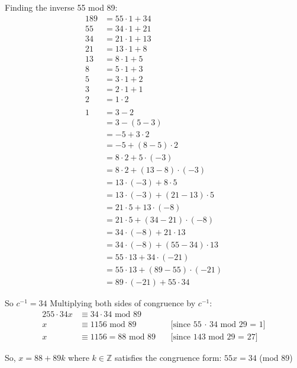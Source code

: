 \documentclass{article} %
\begin{document}
    Finding the inverse 55 mod 89:
    \begin{alignat*}{1}
        89 &= 55 \cdot 1 + 34\\
        55 &= 34 \cdot 1 + 21\\
        34 &= 21 \cdot 1 + 13\\
        21 &= 13 \cdot 1 + 8\\
        13 &= 8 \cdot 1 + 5\\
        8 &= 5 \cdot 1 + 3\\
        5 &= 3 \cdot 1 + 2\\
        3 &= 2 \cdot 1 + 1\\
        2 &= 1 \cdot 2\\
        \\
        1 &= 3 - 2\\
        &= 3 - (5 - 3)\\
        &= -5 + 3 \cdot 2\\
        &= -5 + (8 - 5) \cdot 2\\
        &= 8 \cdot 2 + 5 \cdot (-3)\\
        &= 8 \cdot 2 + (13 - 8) \cdot (-3)\\
        &= 13 \cdot (-3) + 8 \cdot 5\\
        &= 13 \cdot (-3) + (21 - 13) \cdot 5\\
        &= 21 \cdot 5 + 13 \cdot (-8)\\
        &= 21 \cdot 5 + (34 - 21) \cdot (-8)\\
        &= 34 \cdot (-8) + 21 \cdot 13\\
        &= 34 \cdot (-8) + (55 - 34) \cdot 13\\
        &= 55 \cdot 13 + 34 \cdot (-21)\\
        &= 55 \cdot 13 + (89 - 55) \cdot (-21)\\
        &= 89 \cdot (-21) + 55 \cdot 34
    \end{alignat*}

    So $c^{-1} = 34$
    Multiplying both sides of congruence by $c^{-1}$:
    \begin{alignat*}{2}
        55 \cdot 34x &\equiv 34 \cdot 34 \text{ mod } 89\ \\
        x &\equiv 1156 \text{ mod } 89 && \text{[since 55 $\cdot$ 34 mod 29 = 1]}\\
        x &\equiv 1156 = 88 \text{ mod } 89\ && \text{[since 143 mod 29 = 27]}
    \end{alignat*}

    So, $x = 88 + 89k$ where $k \in \mathbb{Z}$ satisfies the congruence form: $55x = 34$ (mod 89)
\end{document}
